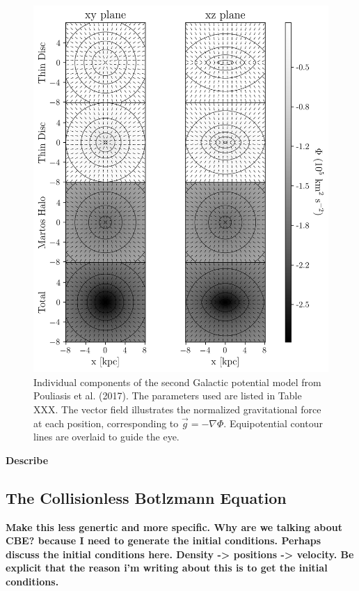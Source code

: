         \begin{figure}
            \centering
            \includegraphics[width=\linewidth]{images/figure_pouliasis2017pii_potential_-8_8.png}
            \caption{Individual components of the second Galactic potential model from Pouliasis et al. (2017). The parameters used are listed in Table XXX. The vector field illustrates the normalized gravitational force at each position, corresponding to $\vec{g} = -\nabla\Phi$. Equipotential contour lines are overlaid to guide the eye.}
            \label{fig:figure_pouliasis2017pii_potential}
        \end{figure}        

        \textbf{Describe }
    
    \subsection{The Collisionless Botlzmann Equation}

        \textbf{Make this less genertic and more specific. Why are we talking about CBE? because I need to generate the initial conditions. Perhaps discuss the initial conditions here.  Density -> positions -> velocity. Be explicit that the reason i'm writing about this is to get the initial conditions.}

